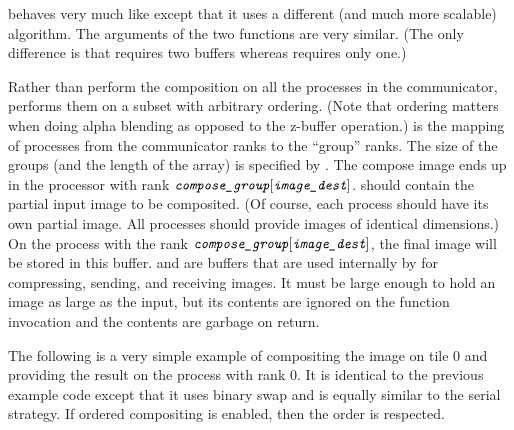  behaves very much like 
except that it uses a different (and much more scalable) algorithm.  The
arguments of the two functions are very similar. (The only difference is
that  requires two  buffers
whereas  requires only one.) 

Rather than perform the composition on all the processes in the
communicator,  performs them on a subset with
arbitrary ordering. (Note that ordering matters when doing alpha blending
as opposed to the z-buffer operation.)   is the
mapping of processes from the communicator ranks to the ``group'' ranks.
The size of the groups (and the length of the  array)
is specified by .  The compose image ends up in the
processor with rank $\emph{\texttt{compose\_group}}[\emph{\texttt{image\_dest}}]$.
 should contain the partial input image to be
composited. (Of course, each process should have its own partial image.
All processes should provide images of identical dimensions.)  On the
process with the rank $\emph{\texttt{compose\_group}}[\emph{\texttt{image\_dest}}]$, the
final image will be stored in this buffer.   and
 are buffers that are used internally by
 for compressing, sending, and receiving images.  It
must be large enough to hold an image as large as the input, but its
contents are ignored on the function invocation and the contents are
garbage on return.

The following is a very simple example of compositing the image on tile 0
and providing the result on the process with rank 0.  It is identical to
the previous example code except that it uses binary swap and is equally
similar to the serial strategy.  If ordered
compositing is enabled, then the order is respected.

